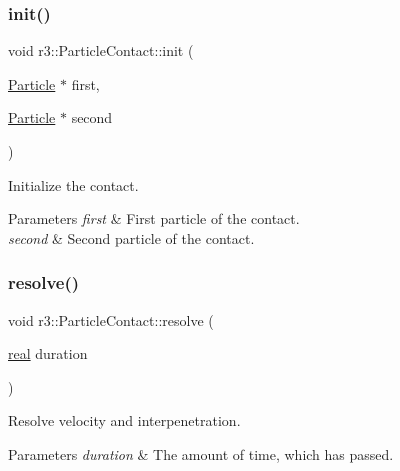 \subsubsection{\texorpdfstring{init()}{init()}}
{\footnotesize\ttfamily void r3\+::\+Particle\+Contact\+::init (\begin{DoxyParamCaption}\item[{\mbox{\hyperlink{classr3_1_1_particle}{Particle}} $\ast$}]{first,  }\item[{\mbox{\hyperlink{classr3_1_1_particle}{Particle}} $\ast$}]{second }\end{DoxyParamCaption})}



Initialize the contact. 


\begin{DoxyParams}{Parameters}
{\em first} & First particle of the contact. \\
\hline
{\em second} & Second particle of the contact. \\
\hline
\end{DoxyParams}
\mbox{\label{classr3_1_1_particle_contact_a2878440163ead45a12454b90d3d1d774}} 
\subsubsection{\texorpdfstring{resolve()}{resolve()}}
{\footnotesize\ttfamily void r3\+::\+Particle\+Contact\+::resolve (\begin{DoxyParamCaption}\item[{\mbox{\hyperlink{namespacer3_ab2016b3e3f743fb735afce242f0dc1eb}{real}}}]{duration }\end{DoxyParamCaption})}



Resolve velocity and interpenetration. 


\begin{DoxyParams}{Parameters}
{\em duration} & The amount of time, which has passed. \\
\hline
\end{DoxyParams}
\mbox{\label{classr3_1_1_particle_contact_a7ed5b4704d5e4159b8e986b5dbf4d585}} 

